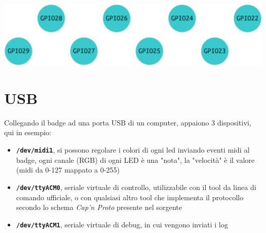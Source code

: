 \documentclass[10pt]{datasheet}
\newcommand*\circled[1]{\tikz[baseline=(char.base)]{
		\node[shape=circle,draw,inner sep=2pt, fill=white] (char) {#1};}}
\begin{document}
	\begin{center}
		\includegraphics[scale=0.75]{gpio}

		
	\end{center}
\vspace*{-20pt}
\section{USB}
Collegando il badge ad una porta USB di un computer, appaiono 3 dispositivi, qui in esempio:
\begin{itemize}
	\item {\textbf{\texttt{/dev/midi1}}, si possono regolare i colori di ogni led inviando eventi midi al badge, ogni canale (RGB) di ogni LED è una "nota", la "velocità" è il valore (midi da 0-127 mappato a 0-255)}
	\item{\textbf{\texttt{/dev/ttyACM0}}, seriale virtuale di controllo, utilizzabile con il tool da linea di comando ufficiale, o con qualsiasi altro tool che implementa il protocollo secondo lo schema \textit{Cap'n Proto} presente nel sorgente}
	\item{\textbf{\texttt{/dev/ttyACM1}}, seriale virtuale di debug, in cui vengono inviati i log}
\end{itemize}
\end{document}
